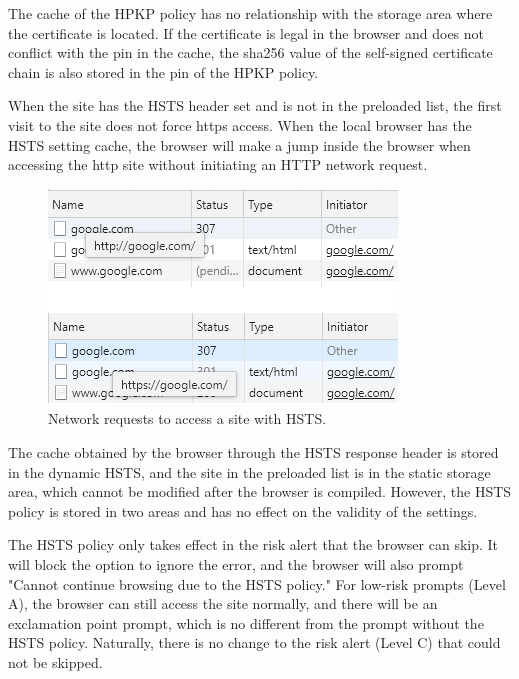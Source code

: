 The cache of the HPKP policy has no relationship with the storage area where the certificate is located. If the certificate is legal in the browser and does not conflict with the pin in the cache, the sha256 value of the self-signed certificate chain is also stored in the pin of the HPKP policy.

When the site has the HSTS header set and is not in the preloaded list, the first visit to the site does not force https access. When the local browser has the HSTS setting cache, the browser will make a jump inside the browser when accessing the http site without initiating an HTTP network request.

\begin{figure}[htbp]
\centerline{\includegraphics{Figure/fig5.png}}
\caption{Network requests to access a site with HSTS.}
\label{fig}
\end{figure}

The cache obtained by the browser through the HSTS response header is stored in the dynamic HSTS, and the site in the preloaded list is in the static storage area, which cannot be modified after the browser is compiled. However, the HSTS policy is stored in two areas and has no effect on the validity of the settings.

The HSTS policy only takes effect in the risk alert that the browser can skip. It will block the option to ignore the error, and the browser will also prompt "Cannot continue browsing due to the HSTS policy." For low-risk prompts (Level A), the browser can still access the site normally, and there will be an exclamation point prompt, which is no different from the prompt without the HSTS policy. Naturally, there is no change to the risk alert (Level C) that could not be skipped.

